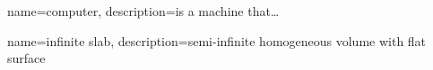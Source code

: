{
    name=computer,
    description={is a machine that\ldots}
}

{
    name={infinite slab},
    description={semi-infinite homogeneous volume with flat surface}
}